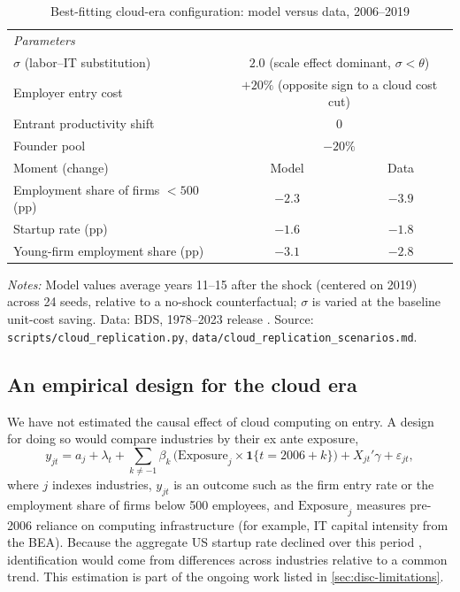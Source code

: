 \begin{table}[t]
  \centering
  \caption{Best-fitting cloud-era configuration: model versus data, 2006--2019}
  \label{tab:cloud-results}
  \begin{tabular}{lcc}
    \toprule
    \multicolumn{3}{l}{\textit{Parameters}} \\
    $\sigma$ (labor--IT substitution) & \multicolumn{2}{c}{$2.0$ (scale effect dominant, $\sigma < \theta$)} \\
    Employer entry cost & \multicolumn{2}{c}{$+20\%$ (opposite sign to a cloud cost cut)} \\
    Entrant productivity shift & \multicolumn{2}{c}{$0$} \\
    Founder pool & \multicolumn{2}{c}{$-20\%$} \\
    \midrule
    Moment (change) & Model & Data \\
    \midrule
    Employment share of firms $<500$ (pp) & $-2.3$ & $-3.9$ \\
    Startup rate (pp) & $-1.6$ & $-1.8$ \\
    Young-firm employment share (pp) & $-3.1$ & $-2.8$ \\
    \bottomrule
  \end{tabular}
  \par\smallskip
  \parbox{0.85\linewidth}{\footnotesize \textit{Notes:} Model values average years 11--15 after the shock (centered on 2019) across 24 seeds, relative to a no-shock counterfactual; $\sigma$ is varied at the baseline unit-cost saving. Data: BDS, 1978--2023 release \citep{bds2021}. Source: \texttt{scripts/cloud\_replication.py}, \texttt{data/cloud\_replication\_scenarios.md}.}
\end{table}

\subsection{An empirical design for the cloud era}\label{sec:cloud-strategy}

We have not estimated the causal effect of cloud computing on entry.
A design for doing so would compare industries by their ex ante exposure,
\begin{equation}\label{eq:cloud-event}
  y_{jt} = a_j + \lambda_t + \sum_{k \neq -1} \beta_k \, \bigl( \text{Exposure}_j \times \mathbf{1}\{t = 2006 + k\} \bigr) + X_{jt}'\gamma + \varepsilon_{jt},
\end{equation}
where $j$ indexes industries, $y_{jt}$ is an outcome such as the firm entry rate or the employment share of firms below 500 employees, and $\text{Exposure}_j$ measures pre-2006 reliance on computing infrastructure (for example, IT capital intensity from the BEA).
Because the aggregate US startup rate declined over this period \citep{decker2016declining}, identification would come from differences across industries relative to a common trend.
This estimation is part of the ongoing work listed in \cref{sec:disc-limitations}.
